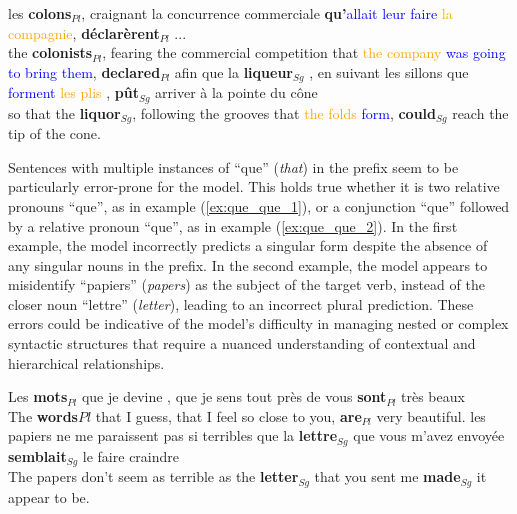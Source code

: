 \begin{exe}
    \ex \label{ex:s_v_inversion_1} les \textbf{colons}$_{Pl}$, craignant la concurrence commerciale \textbf{qu'}\textcolor{blue}{allait leur faire} \textcolor{orange}{la compagnie}, \textbf{déclarèrent}$_{Pl}$ ... \\
    {\fontsize{11}{11}\selectfont the \textbf{colonists}$_{Pl}$, fearing the commercial competition that \textcolor{orange}{the company} \textcolor{blue}{was going to bring them}, \textbf{declared}$_{Pl}$ }
    \ex \label{ex:s_v_inversion_2} afin que la \textbf{liqueur}$_{Sg}$ , en suivant les sillons que \textcolor{blue}{forment} \textcolor{orange}{les plis} , \textbf{pût}$_{Sg}$ arriver à la pointe du cône \\
    {\fontsize{11}{11}\selectfont so that the \textbf{liquor}$_{Sg}$, following the grooves that \textcolor{orange}{the folds} \textcolor{blue}{form}, \textbf{could}$_{Sg}$ reach the tip of the cone.}
\end{exe}

Sentences with multiple instances of ``que'' (\textit{that}) in the prefix seem to be particularly error-prone for the model. This holds true whether it is two relative pronouns ``que'', as in example (\ref{ex:que_que_1}), or a conjunction ``que'' followed by a relative pronoun ``que'', as in example (\ref{ex:que_que_2}). In the first example, the model incorrectly predicts a singular form despite the absence of any singular nouns in the prefix. In the second example, the model appears to misidentify ``papiers'' (\textit{papers}) as the subject of the target verb, instead of the closer noun ``lettre'' (\textit{letter}), leading to an incorrect plural prediction. These errors could be indicative of the model's difficulty in managing nested or complex syntactic structures that require a nuanced understanding of contextual and hierarchical relationships.

\begin{exe}
    \ex \label{ex:que_que_1} Les \textbf{mots}$_{Pl}$ \textcolor{blue!40!green!90}{que} je devine , \textcolor{blue!40!green!90}{que} je sens tout près de vous \textbf{sont}$_{Pl}$ très beaux \\
    {\fontsize{11}{11}\selectfont The \textbf{words}${Pl}$ that I guess, that I feel so close to you, \textbf{are}$_{Pl}$ very beautiful.}
    \ex \label{ex:que_que_2}les papiers ne me paraissent pas si terribles \textcolor{blue!40!green!90}{que} la \textbf{lettre}$_{Sg}$ \textcolor{blue!40!green!90}{que} vous m'avez envoyée \textbf{semblait}$_{Sg}$ le faire craindre \\
    {\fontsize{11}{11}\selectfont The papers don't seem as terrible as the \textbf{letter}$_{Sg}$ that you sent me \textbf{made}$_{Sg}$ it appear to be.}
\end{exe}


